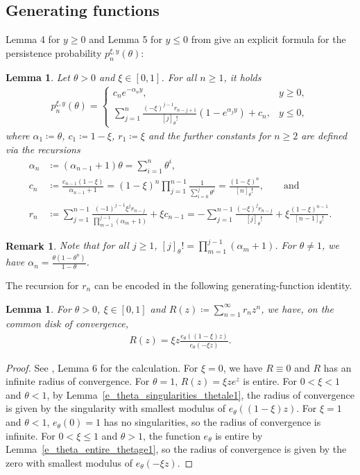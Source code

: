 \documentclass[10pt,a4paper]{amsart}
\newcommand{\1}{\mathds{1}}
\renewcommand{\r}{\mathscr{R}}
\newtheorem{Lemma}[definition]{Lemma}
\newtheorem{Remark}{Remark}
\begin{document}
\subsection{Generating functions}
Lemma 4 for $y\geq0$ and Lemma 5 for $y\leq 0$ from \cite{AR} give an explicit formula for the persistence probability $p_n^{\xi,y}(\theta)$:
\begin{Lemma}\label{P_x_theta_positiv}
    Let $\theta>0$ and $\xi\in[0,1]$. For all $n\geq1$, it holds
        \begin{align*}
        p_n^{\xi,y}(\theta)=\begin{cases}
            c_ne^{-\alpha_ny}, & y\geq 0,
        \\
        \sum_{j=1}^n \frac{(-\xi)^{j-1} r_{n-j+1}}{[j]_\theta!} \left(1 - e^{\alpha_j y} \right)+c_n, &y\leq 0,
        \end{cases}
    \end{align*}
where $\alpha_1\coloneqq\theta$, $c_1\coloneqq 1-\xi$, $r_1\coloneqq \xi$ and the further constants for $n\ge 2$ are defined via the recursions
\begin{align*}
    \alpha_n&\coloneqq (\alpha_{n-1}+1)\theta=\sum_{i=1}^n\theta^i,
    \\c_n&\coloneqq\frac{c_{n-1}(1-\xi)}{\alpha_{n-1}+1}=(1-\xi)^n\prod_{j=1}^{n-1}\frac{1}{\sum_{i=0}^j\theta^i}=\frac{(1-\xi)^n}{[n]_\theta!},\qquad \text{and}
    \\r_n&\coloneqq\sum_{j=1}^{n-1}\frac{(-1)^{j-1}\xi^jr_{n-j}}{\prod_{m=1}^{j-1} (\alpha_m + 1)}+\xi c_{n-1}=-\sum_{j=1}^{n-1}\frac{(-\xi)^jr_{n-j}}{[j]_\theta!}+\xi\frac{(1-\xi)^{n-1}}{[n-1]_\theta!}.
\end{align*}
\end{Lemma}
\begin{Remark}
    Note that for all $j\ge 1$, $[j]_\theta!=\prod_{m=1}^{j-1} (\alpha_m + 1)$. For $\theta\neq1$, we have $\alpha_n=\frac{\theta(1-\theta^n)}{1-\theta}$.
\end{Remark}
The recursion for $r_n$ can be encoded in the following generating-function identity.
\begin{Lemma}\label{def_R}
    For $\theta>0$, $\xi\in[0,1]$ and $R(z)\coloneqq \sum_{n=1}^{\infty}r_nz^n$, we have, on the common disk of convergence,
    \begin{align*}
        R(z)=\xi z\frac{e_\theta((1-\xi)z)}{e_\theta(-\xi z)}.
    \end{align*}
\end{Lemma}
\begin{proof}
        See \cite{AR}, Lemma 6 for the calculation. For $\xi=0$, we have $R\equiv 0$ and $R$ has an infinite radius of convergence. For $\theta=1$, $R(z)=\xi ze^z$ is entire. For $0<\xi<1$ and $\theta<1$, by Lemma~\ref{e_theta_singularities_thetale1}, the radius of convergence is given by the singularity with smallest modulus of $e_\theta((1-\xi)z)$. For $\xi=1$ and $\theta<1$, $e_\theta(0)=1$ has no singularities, so the radius of convergence is infinite. For $0<\xi\le1$ and $\theta> 1$, the function $e_\theta$ is entire by Lemma~\ref{e_theta_entire_thetage1}, so the radius of convergence is given by the zero with smallest modulus of $e_\theta(-\xi z)$. 
    \end{proof}
\end{document}
